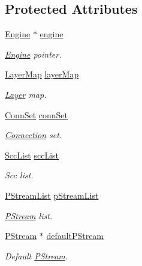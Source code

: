 \subsection*{Protected Attributes}
\begin{DoxyCompactItemize}
\item 
\hyperlink{classfractal_1_1Engine}{Engine} $\ast$ \hyperlink{classfractal_1_1Rnn_ae1ab28da171d29e77200295cf86e85f7}{engine}
\begin{DoxyCompactList}\small\item\em \hyperlink{classfractal_1_1Engine}{Engine} pointer. \end{DoxyCompactList}\item 
\hyperlink{classfractal_1_1Rnn_a41ef29c0e8d4bfa783a6abe33b685ec0}{Layer\+Map} \hyperlink{classfractal_1_1Rnn_ae1950b5b6ceb1b32a063d10b6e392f1d}{layer\+Map}
\begin{DoxyCompactList}\small\item\em \hyperlink{classfractal_1_1Layer}{Layer} map. \end{DoxyCompactList}\item 
\hyperlink{classfractal_1_1Rnn_a9899dedd3e89a1375a09ba7cc86fbf2b}{Conn\+Set} \hyperlink{classfractal_1_1Rnn_adc46382430319f0ef64ee9119f370cad}{conn\+Set}
\begin{DoxyCompactList}\small\item\em \hyperlink{classfractal_1_1Connection}{Connection} set. \end{DoxyCompactList}\item 
\hyperlink{classfractal_1_1Rnn_a640b44b0317d2b4055fcdabbfd6456ce}{Scc\+List} \hyperlink{classfractal_1_1Rnn_a796f665aead28ee054bd7eaec5270329}{scc\+List}
\begin{DoxyCompactList}\small\item\em Scc list. \end{DoxyCompactList}\item 
\hyperlink{classfractal_1_1Rnn_af804f677610b7429ca199ac35510e503}{P\+Stream\+List} \hyperlink{classfractal_1_1Rnn_a0e876daf59f24181e88726b181b28748}{p\+Stream\+List}
\begin{DoxyCompactList}\small\item\em \hyperlink{classfractal_1_1PStream}{P\+Stream} list. \end{DoxyCompactList}\item 
\hyperlink{classfractal_1_1PStream}{P\+Stream} $\ast$ \hyperlink{classfractal_1_1Rnn_a69ee08dd3cf7e88e99b8138db8cdf8d7}{default\+P\+Stream}
\begin{DoxyCompactList}\small\item\em Default \hyperlink{classfractal_1_1PStream}{P\+Stream}. \end{DoxyCompactList}\item 

\end{DoxyCompactItemize}

